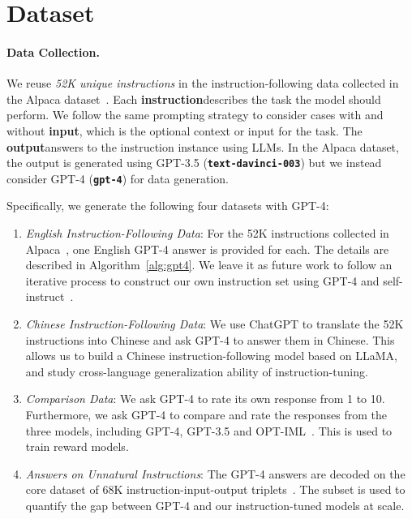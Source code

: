 \section{Dataset}

\label{sec:data}

\paragraph{Data Collection.}

We reuse {\it 52K unique instructions} in the instruction-following data collected in the Alpaca dataset~\citep{alpaca}. Each \textnormal{\textcolor{blue!90!black}{\ttfamily\bfseries instruction}}\unskip describes the task the model should perform. We follow the same prompting strategy to consider cases with and without \textnormal{\textcolor{blue!90!black}{\ttfamily\bfseries input}}\unskip, which is the optional context or input for the task. The \textnormal{\textcolor{blue!90!black}{\ttfamily\bfseries output}}\unskip answers to the instruction instance using LLMs. In the Alpaca dataset, the output is generated using GPT-3.5 (\texttt{\bfseries text-davinci-003}) but we instead consider GPT-4 (\texttt{\bfseries gpt-4}) for data generation. 

Specifically, we generate the following four datasets with GPT-4:

\begin{minipage}{1.0\textwidth}
\centering

\begin{enumerate}[label=(\arabic*),leftmargin=7.5mm]
\item 
{\it English Instruction-Following Data}: For the 52K instructions collected in Alpaca~\citep{alpaca}, one English GPT-4 answer is provided for each. The details are described in Algorithm~\ref{alg:gpt4}. We leave it as future work to follow an iterative process to construct our own instruction set using GPT-4 and self-instruct~\citep{wang2022self}. 
\item
{\it Chinese Instruction-Following Data}: We use ChatGPT to translate the 52K instructions into Chinese and ask GPT-4 to answer them in Chinese. This allows us to build a Chinese instruction-following model based on LLaMA, and study cross-language generalization ability of instruction-tuning.
\item
{\it Comparison Data}: We ask GPT-4 to rate its own response from 1 to 10. Furthermore, we ask GPT-4 to compare and rate the responses from the three models, including GPT-4, GPT-3.5 and OPT-IML~\citep{iyer2022opt}. This is used to train reward models.

\item
{\it Answers on Unnatural Instructions}: The GPT-4 answers are decoded on the core dataset of 68K instruction-input-output triplets~\citep{honovich2022unnatural}. The subset is used to quantify the gap between GPT-4 and our instruction-tuned models at scale.
\end{enumerate}

\end{minipage}

